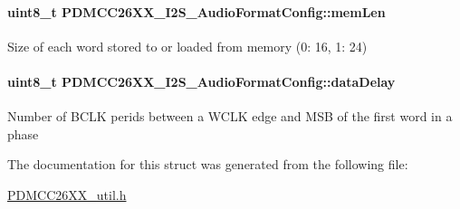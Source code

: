 \paragraph[{mem\+Len}]{\setlength{\rightskip}{0pt plus 5cm}uint8\+\_\+t P\+D\+M\+C\+C26\+X\+X\+\_\+\+I2\+S\+\_\+\+Audio\+Format\+Config\+::mem\+Len}\label{struct_p_d_m_c_c26_x_x___i2_s___audio_format_config_aa6310978bb3efcf50aab7226f34597b1}
Size of each word stored to or loaded from memory (0\+: 16, 1\+: 24) 
\paragraph[{data\+Delay}]{\setlength{\rightskip}{0pt plus 5cm}uint8\+\_\+t P\+D\+M\+C\+C26\+X\+X\+\_\+\+I2\+S\+\_\+\+Audio\+Format\+Config\+::data\+Delay}\label{struct_p_d_m_c_c26_x_x___i2_s___audio_format_config_a8fbefceb8a0609ab4dee5beeecec98e6}
Number of B\+C\+L\+K perids between a W\+C\+L\+K edge and M\+S\+B of the first word in a phase 

The documentation for this struct was generated from the following file\+:\begin{DoxyCompactItemize}
\item 
\hyperlink{_p_d_m_c_c26_x_x__util_8h}{P\+D\+M\+C\+C26\+X\+X\+\_\+util.\+h}\end{DoxyCompactItemize}
